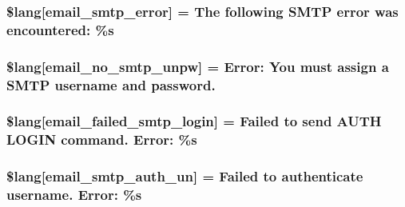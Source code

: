 \subsubsection[{\$lang}]{\setlength{\rightskip}{0pt plus 5cm}\$lang\mbox{[}\textquotesingle{}email\+\_\+smtp\+\_\+error\textquotesingle{}\mbox{]} = \textquotesingle{}The following S\+M\+T\+P error was encountered\+: \%s\textquotesingle{}}\label{system_2language_2english_2email__lang_8php_a3d70a704117491053ad9c0b4065ecd3f}
\hypertarget{system_2language_2english_2email__lang_8php_a268c3e96fea16a903e7488f03960e89a}{}
\subsubsection[{\$lang}]{\setlength{\rightskip}{0pt plus 5cm}\$lang\mbox{[}\textquotesingle{}email\+\_\+no\+\_\+smtp\+\_\+unpw\textquotesingle{}\mbox{]} = \textquotesingle{}Error\+: You must assign {\bf a} S\+M\+T\+P username and password.\textquotesingle{}}\label{system_2language_2english_2email__lang_8php_a268c3e96fea16a903e7488f03960e89a}
\hypertarget{system_2language_2english_2email__lang_8php_a791781c2fd1bd8ec87158be649519621}{}
\subsubsection[{\$lang}]{\setlength{\rightskip}{0pt plus 5cm}\$lang\mbox{[}\textquotesingle{}email\+\_\+failed\+\_\+smtp\+\_\+login\textquotesingle{}\mbox{]} = \textquotesingle{}Failed to send A\+U\+T\+H L\+O\+G\+I\+N command. Error\+: \%s\textquotesingle{}}\label{system_2language_2english_2email__lang_8php_a791781c2fd1bd8ec87158be649519621}
\hypertarget{system_2language_2english_2email__lang_8php_a69f2fa5072f039936748571ea5cc9cba}{}
\subsubsection[{\$lang}]{\setlength{\rightskip}{0pt plus 5cm}\$lang\mbox{[}\textquotesingle{}email\+\_\+smtp\+\_\+auth\+\_\+un\textquotesingle{}\mbox{]} = \textquotesingle{}Failed to authenticate username. Error\+: \%s\textquotesingle{}}\label{system_2language_2english_2email__lang_8php_a69f2fa5072f039936748571ea5cc9cba}
\hypertarget{system_2language_2english_2email__lang_8php_a09fd123f0d251a8eac845f985c6583c3}{}
